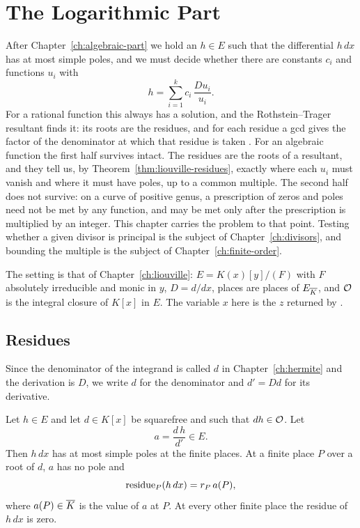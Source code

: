 \chapter{The Logarithmic Part}\label{ch:logarithmic-part}

After Chapter~\ref{ch:algebraic-part} we hold an $h \in E$ such that the
differential $h\,dx$ has at most simple poles, and we must decide whether
there are constants $c_i$ and functions $u_i$ with
\begin{equation}\label{eq:log-sum}
  h = \sum_{i=1}^k c_i\, \frac{Du_i}{u_i} .
\end{equation}
For a rational function this always has a solution, and the Rothstein--Trager
resultant finds it: its roots are the residues, and for each residue a gcd
gives the factor of the denominator at which that residue is taken
. For an algebraic function the first half survives intact. The
residues are the roots of a resultant, and they tell us, by
Theorem~\ref{thm:liouville-residues}, exactly where each $u_i$ must vanish
and where it must have poles, up to a common multiple. The second half does
not survive: on a curve of positive genus, a prescription of zeros and poles
need not be met by any function, and may be met only after the prescription
is multiplied by an integer. This chapter carries the problem to that point.
Testing whether a given divisor is principal is the subject of
Chapter~\ref{ch:divisors}, and bounding the multiple is the subject of
Chapter~\ref{ch:finite-order}.

The setting is that of Chapter~\ref{ch:liouville}: $E = K(x)[y]/(F)$ with $F$
absolutely irreducible and monic in $y$, $D = d/dx$, places are places of
$E_{\overline{K}}$, and $\mathcal{O}$ is the integral closure of $K[x]$ in $E$. The variable
$x$ here is the $z$ returned by .

\section{Residues}\label{sec:log-residues}

Since the denominator of the integrand is called $d$ in
Chapter~\ref{ch:hermite} and the derivation is $D$, we write $d$ for the
denominator and $d' = Dd$ for its derivative.

\begin{lemma}\label{lem:residue-value}
Let $h \in E$ and let $d \in K[x]$ be squarefree and such that $d h \in \mathcal{O}$.
Let
\[
  a = \frac{d\,h}{d'} \in E .
\]
Then $h\,dx$ has at most simple poles at the finite places. At a finite place
$P$ over a root of $d$, $a$ has no pole and
\[
  \operatorname{residue}_P(h\,dx) = r_P\, a(P) ,
\]
where $a(P) \in \overline{K}$ is the value of $a$ at $P$. At every other finite
place the residue of $h\,dx$ is zero.
\end{lemma}


